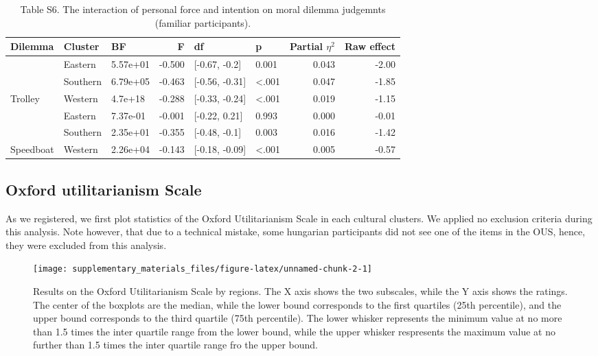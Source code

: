 \documentclass[
]{article}
\begin{document}
\begin{table}[H]

\caption{\label{tab:Study2ab Bayesian}Table S6. The interaction of personal force and intention on moral dilemma judgemnts (familiar participants).}
\begin{tabular}[t]{lllrllrr}
\toprule
\textbf{Dilemma} & \textbf{Cluster} & \textbf{BF} & \textbf{F} & \textbf{df} & \textbf{p} & \textbf{Partial $\eta^2$} & \textbf{Raw effect}\\
\midrule
 & Eastern & 5.57e+01 & -0.500 & {}[-0.67, -0.2] & 0.001 & 0.043 & -2.00\\

 & Southern & 6.79e+05 & -0.463 & {}[-0.56, -0.31] & <.001 & 0.047 & -1.85\\

\multirow[t]{-3}{*}{\raggedright\arraybackslash Trolley} & Western & 4.7e+18 & -0.288 & {}[-0.33, -0.24] & <.001 & 0.019 & -1.15\\
\cmidrule{1-8}
 & Eastern & 7.37e-01 & -0.001 & {}[-0.22, 0.21] & 0.993 & 0.000 & -0.01\\

 & Southern & 2.35e+01 & -0.355 & {}[-0.48, -0.1] & 0.003 & 0.016 & -1.42\\

\multirow[t]{-3}{*}{\raggedright\arraybackslash Speedboat} & Western & 2.26e+04 & -0.143 & {}[-0.18, -0.09] & <.001 & 0.005 & -0.57\\
\bottomrule
\end{tabular}
\end{table}

\hypertarget{oxford-utilitarianism-scale}{%
\subsection{Oxford utilitarianism
Scale}\label{oxford-utilitarianism-scale}}

As we registered, we first plot statistics of the Oxford Utilitarianism
Scale in each cultural clusters. We applied no exclusion criteria during
this analysis. Note however, that due to a technical mistake, some
hungarian participants did not see one of the items in the OUS, hence,
they were excluded from this analysis.

\begin{figure}[H]
\texttt{[image: supplementary\_materials\_files/figure-latex/unnamed-chunk-2-1]} \caption{Results on the Oxford Utilitarianism Scale by regions. The X axis shows the two subscales, while the Y axis shows the ratings. The center of the boxplots are the median, while the lower bound corresponds to the first quartiles (25th percentile), and the upper bound corresponds to the third quartile (75th percentile). The lower whisker represents the minimum value at no more than 1.5 times the inter quartile range from the lower bound, while the upper whisker respresents the maximum value at no further than 1.5 times the inter quartile range fro the upper bound.}\label{fig:unnamed-chunk-2}
\end{figure}
\end{document}

